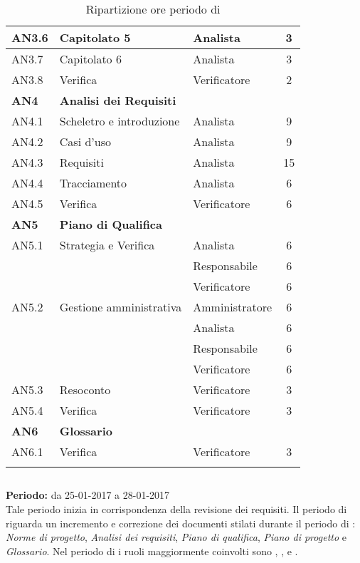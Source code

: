\begin{longtable}{|l|l|l|c|}
      	{AN3.6} & {Capitolato 5} & Analista  & 3 \\
      	\hline
      	{AN3.7} & {Capitolato 6} & Analista  & 3 \\
      	\hline
      	{AN3.8} & {Verifica} & Verificatore  & 2 \\
      \hline
      \textbf{AN4} & \textbf{Analisi dei Requisiti} & &  \\
         \hline
         {AN4.1} & {Scheletro e introduzione} & Analista  &  9\\
         \hline
         {AN4.2} & {Casi d'uso} & Analista  &  9\\
         \hline
         {AN4.3} & {Requisiti} & Analista  &  15\\
         \hline
         {AN4.4} & {Tracciamento} & Analista  &  6\\
         \hline
         {AN4.5} & {Verifica} & Verificatore  & 6\\
     \hline
     \textbf{AN5} & \textbf{Piano di Qualifica} & &  \\
         \hline
         {AN5.1} & {Strategia e Verifica} & Analista &  6 \\
         & & Responsabile & 6\\
         & & Verificatore & 6\\
         \hline
         {AN5.2} & {Gestione amministrativa} & Amministratore & 6\\
         & & Analista & 6\\
         & & Responsabile & 6\\
         & & Verificatore & 6\\
         \hline
         {AN5.3} & {Resoconto} & Verificatore &  3\\
         \hline
         {AN5.4} & {Verifica} & Verificatore &  3 \\
     \hline
     \textbf{AN6} & \textbf{Glossario} & &  \\
         \hline
         {AN6.1} & {Verifica} & Verificatore &  3 \\
         \hline
  
     \caption{Ripartizione ore periodo di \AR{}}
\end{longtable}
\egroup
  
\subsection{\AD{}}
\textbf{Periodo:} da 25-01-2017 a 28-01-2017 \\
Tale periodo inizia in corrispondenza della revisione dei requisiti. Il periodo di \AD{} riguarda un incremento e correzione dei documenti stilati durante il periodo di \AR{}: \textit{Norme di progetto}, \textit{Analisi dei requisiti}, \textit{Piano di qualifica}, \textit{Piano di progetto} e \textit{Glossario}.
Nel periodo di \AD{} i ruoli maggiormente coinvolti sono \Analista{}, \Responsabile{}, \Amministratore{} e \Verificatore{}.

